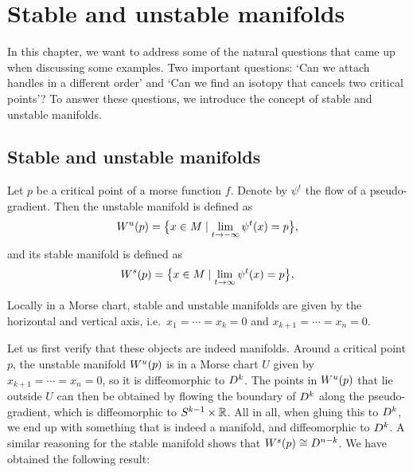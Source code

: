 \chapter{Stable and unstable manifolds}


In this chapter, we want to address some of the natural questions that came up when discussing some examples.
Two important questions: `Can we attach handles in a different order' and `Can we find an isotopy that cancels two critical points'?
To answer these questions, we introduce the concept of stable and unstable manifolds.

\section{Stable and unstable manifolds}


\begin{definition}
    Let $p$ be a critical point of a morse function $f$.
    Denote by $\psi^{t}$ the flow of a pseudo-gradient.
    Then the unstable manifold is defined as
    \[
        W^u(p) = \big\{x \in M  \mid  \lim_{t \to -\infty} \psi^{t} (x)  = p\big\} 
    ,\] 
    and its stable manifold is defined as
    \[
        W^s(p) = \big\{x \in M  \mid  \lim_{t \to \infty} \psi^{t} (x)  = p\big\} 
    ,\] 
\end{definition}
\begin{marginfigure}
    \centering
    \caption{Locally in a Morse chart, stable and unstable manifolds are given by the horizontal and vertical axis, i.e.\ $ x_1= \cdots= x_k = 0$ and $x_{k+1}= \cdots= x_n = 0$.}
    \label{fig:stable-and-unstable-manifolds-are-manifiolds}
\end{marginfigure}
Let us first verify that these objects are indeed manifolds. 
Around a critical point $p$, the unstable manifold $W^u(p)$ is in a Morse chart $U$ given by $x_{k+1} = \cdots = x_n = 0$, so it is diffeomorphic to $D^{k}$.
The points in $W^u(p)$ that lie outside $U$ can then be obtained by flowing the boundary of $D^{k}$ along the pseudo-gradient, which is diffeomorphic to $S^{k-1} \times \mathbb{R}$. All in all, when gluing this to $D^{k}$, we end up with something that is indeed a manifold, and diffeomorphic to $D^{k}$.
A similar reasoning for the stable manifold shows that $W^s(p) \cong D^{n - k}$.
We have obtained the following result:

